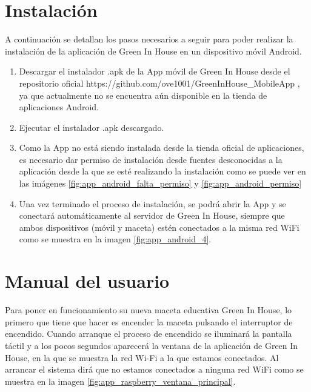 \section{Instalación}
A continuación se detallan los pasos necesarios a seguir para poder realizar la instalación de la aplicación de Green In House en un dispositivo móvil Android.
\begin{enumerate}
    \item Descargar el instalador .apk de la App móvil de Green In House desde el repositorio oficial https://github.com/ove1001/GreenInHouse\_MobileApp \cite{GreenInHouse:repo:AppMovil}, ya que actualmente no se encuentra aún disponible en la tienda de aplicaciones Android.
    \item Ejecutar el instalador .apk descargado.
    \item Como la App no está siendo instalada desde la tienda oficial de aplicaciones, es necesario dar permiso de instalación desde fuentes desconocidas a la aplicación desde la que se esté realizando la instalación como se puede ver en las imágenes \ref{fig:app_android_falta_permiso} y \ref{fig:app_android_permiso}
    \item Una vez terminado el proceso de instalación, se podrá abrir la App y se conectará automáticamente al servidor de Green In House, siempre que ambos dispositivos (móvil y maceta) estén conectados a la misma red WiFi como se muestra en la imagen \ref{fig:app_android_4}.
\end{enumerate}

\section{Manual del usuario}
Para poner en funcionamiento su nueva maceta educativa Green In House, lo primero que tiene que hacer es encender la maceta pulsando el interruptor de encendido. Cuando arranque el proceso de encendido se iluminará la pantalla táctil y a los pocos segundos aparecerá la ventana de la aplicación de Green In House, en la que se muestra la red Wi-Fi a la que estamos conectados. Al arrancar el sistema dirá que no estamos conectados a ninguna red WiFi como se muestra en la imagen \ref{fig:app_raspberry_ventana_principal}.

